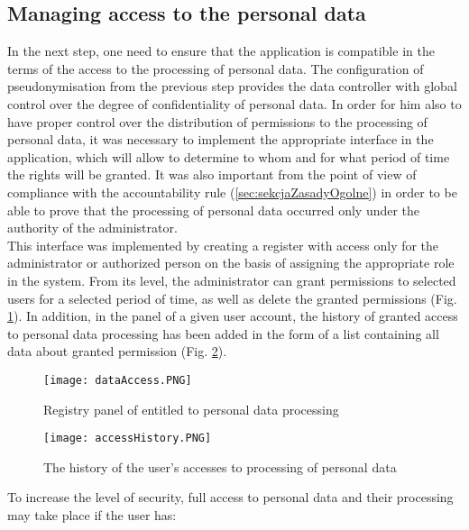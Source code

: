 \documentclass[en, noamssymb]{mgr}
\begin{document}
\subsection{Managing access to the personal data}

In the next step, one need to ensure that the application is compatible in the terms of the access to the processing of personal data. The configuration of pseudonymisation from the previous step provides the data controller with global control over the degree of confidentiality of personal data. In order for him also to have proper control over the distribution of permissions to the processing of personal data, it was necessary to implement the appropriate interface in the application, which will allow to determine to whom and for what period of time the rights will be granted. It was also important from the point of view of compliance with the accountability rule (\ref{sec:sekcjaZasadyOgolne}) in order to be able to prove that the processing of personal data occurred only under the authority of the administrator.\\
\indent This interface was implemented by creating a register with access only for the administrator or authorized person on the basis of assigning the appropriate role in the system. From its level, the administrator can grant permissions to selected users for a selected period of time, as well as delete the granted permissions (Fig. \ref{fig:dataAccessPanel}). In addition, in the panel of a given user account, the history of granted access to personal data processing has been added in the form of a list containing all data about granted permission (Fig. \ref{fig:usersDataAccessHistory}).

\begin{figure}[H]
	\centering
	\texttt{[image: dataAccess.PNG]}
	\caption[Registry panel of entitled to personal data processing]{Registry panel of entitled to personal data processing}
	\label{fig:dataAccessPanel}
\end{figure}

\begin{figure}[H]
	\centering
	\texttt{[image: accessHistory.PNG]}
	\caption[The history of the user's accesses to processing of personal data]{The history of the user's accesses to processing of personal data}
	\label{fig:usersDataAccessHistory}
\end{figure}

To increase the level of security, full access to personal data and their processing may take place if the user has:
\end{document}
